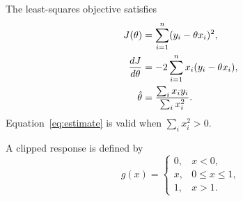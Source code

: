 \documentclass[10pt]{article}
\begin{document}
The least-squares objective satisfies
\begin{align}
  J(\theta) &= \sum_{i=1}^{n}(y_i-\theta x_i)^2, \label{eq:objective}\\
  \frac{dJ}{d\theta} &= -2\sum_{i=1}^{n}x_i(y_i-\theta x_i), \notag\\
  \hat{\theta} &= \frac{\sum_i x_i y_i}{\sum_i x_i^2}. \label{eq:estimate}
\end{align}
Equation~\eqref{eq:estimate} is valid when \(\sum_i x_i^2>0\).

A clipped response is defined by
\begin{equation}
  g(x)=\begin{cases}
    0, & x<0,\\
    x, & 0\leq x\leq 1,\\
    1, & x>1.
  \end{cases}
\end{equation}
\end{document}
